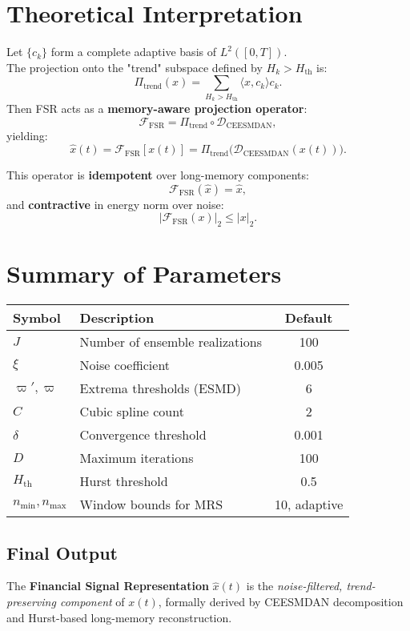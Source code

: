 \documentclass[11pt]{article}
\begin{document}
\section{Theoretical Interpretation}
Let $\{c_k\}$ form a complete adaptive basis of $L^2([0,T])$.\\
The projection onto the "trend" subspace defined by $H_k > H_{\text{th}}$ is:
\[
\Pi_{\text{trend}}(x) = \sum_{H_k>H_{\text{th}}} \langle x, c_k \rangle c_k.
\]
Then FSR acts as a \textbf{memory-aware projection operator}:
\[
\boxed{
\mathcal{F}_{\text{FSR}} = \Pi_{\text{trend}} \circ \mathcal{D}_{\text{CEESMDAN}},
}
\]
yielding:
\[
\hat{x}(t) = \mathcal{F}_{\text{FSR}}[x(t)] = \Pi_{\text{trend}}\Big(\mathcal{D}_{\text{CEESMDAN}}(x(t))\Big).
\]

This operator is \textbf{idempotent} over long-memory components:
\[
\mathcal{F}_{\text{FSR}}(\hat{x}) = \hat{x},
\]
and \textbf{contractive} in energy norm over noise:
\[
|\mathcal{F}_{\text{FSR}}(x)|_2 \le |x|_2.
\]



\section{Summary of Parameters}
\begin{table}[h]
\begin{center}
\begin{tabular}{|l|l|c|}
\hline
Symbol & Description & Default\\
\hline
$J$ & Number of ensemble realizations & 100 \\
\hline
$\xi$ & Noise coefficient & 0.005 \\
\hline
$\varpi', \varpi$ & Extrema thresholds (ESMD) & 6 \\
\hline
$C$ & Cubic spline count & 2 \\
\hline
$\delta$ & Convergence threshold & 0.001 \\
\hline
$D$ & Maximum iterations & 100 \\
\hline
$H_{\text{th}}$ & Hurst threshold & 0.5 \\
\hline
$n_{\min}, n_{\max}$ & Window bounds for MRS & 10, adaptive \\
\hline
\end{tabular}
\end{center}
\end{table}



\subsection{Final Output}
The \textbf{Financial Signal Representation} $\hat{x}(t)$ is the \textit{noise-filtered, trend-preserving component} of $x(t)$, formally derived by CEESMDAN decomposition and Hurst-based long-memory reconstruction.
\end{document}
